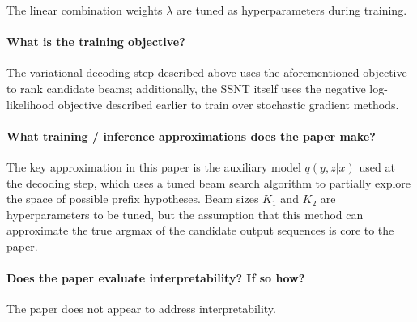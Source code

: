 \documentclass[11pt]{article}
\begin{document}
The linear combination weights $\lambda$ are tuned as hyperparameters during training.

\paragraph{What is the training objective?} The variational decoding step described above uses the aforementioned objective to rank candidate beams; additionally, the SSNT itself uses the negative log-likelihood objective described earlier to train over stochastic gradient methods.

\paragraph{What training / inference approximations does the paper make?} The key approximation in this paper is the auxiliary model $q(y,z|x)$ used at the decoding step, which uses a tuned beam search algorithm to partially explore the space of possible prefix hypotheses. Beam sizes $K_1$ and $K_2$ are hyperparameters to be tuned, but the assumption that this method can approximate the true argmax of the candidate output sequences is core to the paper.

\paragraph{Does the paper evaluate interpretability? If so how?} The paper does not appear to address interpretability.



\end{document}
